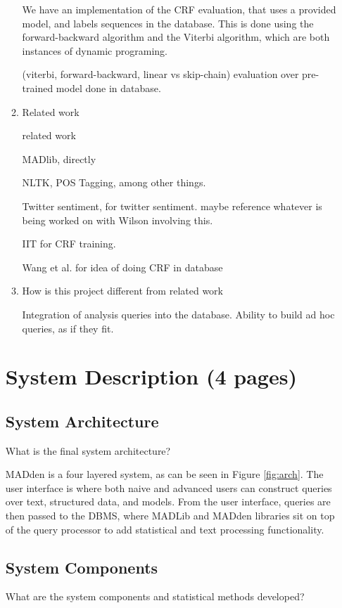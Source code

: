 \documentclass{article}
\newcommand{\system}{MADden\xspace}
\begin{document}
\begin{enumerate}
\begin{enumerate}
    We have an implementation of the CRF evaluation, that uses a provided model, and labels sequences in the database.
    This is done using the forward-backward algorithm and the Viterbi algorithm, which are both instances of dynamic programing.

    (viterbi, forward-backward, linear vs skip-chain) evaluation over pre-trained model done in database.



  \item Related work

    related work

    MADlib, directly

    NLTK, POS Tagging, among other things.

    Twitter sentiment, for twitter sentiment. maybe reference whatever is being worked on with Wilson involving this.

    IIT for CRF training.

    Wang et al. for idea of doing CRF in database

  \item How is this project different from related work

    Integration of analysis queries into the database.
    Ability to build ad hoc queries, as if they fit.
  \end{enumerate}






  \section{System Description (4 pages)}
  \subsection{System Architecture}
  What is the final system architecture?

  {\system} is a four layered system, as can be seen in Figure \ref{fig:arch}.
  The user interface is where both naive and advanced users can construct queries over text, structured data, and models.
  From the user interface,
  queries are then passed to the DBMS,
  where MADLib and {\system} libraries sit on top of the query processor to add statistical and text processing functionality.


  \subsection{System Components}
  What are the system components and statistical methods developed?


\end{enumerate}
\end{document}

